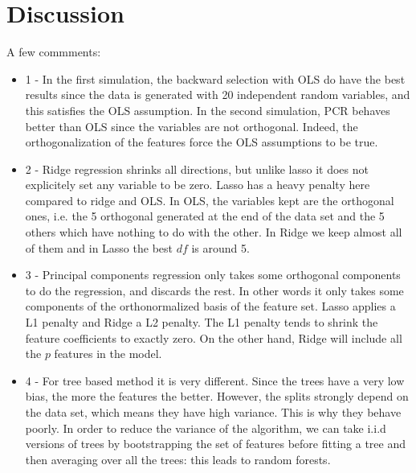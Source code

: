 \documentclass[11pt]{article}\usepackage[]{graphicx}\usepackage[]{color}
\begin{document}
\section{Discussion}
A few commments:
\begin{itemize}
\item 1 - In the first simulation, the backward selection with OLS do have the best results since the data is generated with 20 independent random variables, and this satisfies the OLS assumption. In the second simulation, PCR behaves better than OLS since the variables are not orthogonal. Indeed, the orthogonalization of the features force the OLS assumptions to be true. 
\item 2 - Ridge regression shrinks all directions, but unlike lasso it does not explicitely set any variable to be zero. Lasso has a heavy penalty here compared to ridge and OLS. In OLS, the variables kept are the orthogonal ones, i.e. the 5 orthogonal generated at the end of the data set and the 5 others which have nothing to do with the other. In Ridge we keep almost all of them and in Lasso the best $df$ is around 5.
\item 3 - Principal components regression only takes some orthogonal components to do the regression, and discards the rest. In other words it only takes some components of the orthonormalized basis of the feature set. Lasso applies a L1 penalty and Ridge a L2 penalty. The L1 penalty tends to shrink the feature coefficients to exactly zero. On the other hand, Ridge will include all the $p$ features in the model.
\item 4 - For tree based method it is very different. Since the trees have a very low bias, the more the features the better. However, the splits strongly depend on the data set, which means they have high variance. This is why they behave poorly. In order to reduce the variance of the algorithm, we can take i.i.d versions of trees by bootstrapping the set of features before fitting a tree and then averaging over all the trees: this leads to random forests.
\end{itemize}
\end{document}
